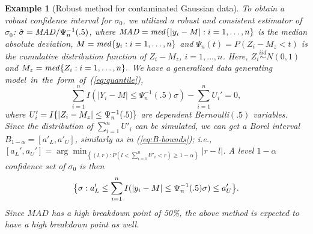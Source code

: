 \documentclass[12pt]{article}
\theoremstyle{shortspace}
\newtheorem{example}{\quad Example}
\begin{document}
\begin{example}[Robust method for contaminated Gaussian data]
To obtain a robust confidence interval for $\sigma_0$, we utilized a robust and consistent estimator of $\sigma_0$: $\hat \sigma = {\it MAD}/\Psi_n^{-1}(.5)$, 
where ${\it MAD} = {\it med}\{|y_i - M|: i = 1, \ldots, n\}$ is the median absolute deviation, $M = {\it med}\{y_i: i = 1, \ldots, n\}$ and $\Psi_n(t) = P(Z_i - M_z < t)$ is the cumulative distribution function of $Z_i - M_z$, $i = 1, \ldots, n$. Here, $Z_i \overset{iid}{\sim} N(0,1)$ and $M_z = {\it med}\{Z_i: i = 1, \ldots, n\}.$ 
We have a generalized data generating model~in~the~form~of~(\ref{eq:quantile}), 
$$\sum_{i = 1}^n I(|Y_i -M| \leq \Psi_n^{-1}(.5)\sigma ) - \sum_{i =1}^n U_i' = 0,$$ 
where $U'_i = I\{|Z_i - M_z| \leq {\small \Psi_n^{-1}(.5)}\}$ are dependent Bernoulli$(.5)$ variables. Since the distribution of $\sum\nolimits_{i = 1}^n U'_i$ can be simulated, we can get 
a Borel interval  $B_{1 -\alpha} = [a'_L, a'_U]$, similarly as in (\ref{eq:B-bounds}); i.e., 
$\left[a_L', a_U'\right] = 
     \arg \min_{\left\{(l,r): 
  P( l < \sum_{i = 1}^n U'_i < r )
     \geq 1-\alpha\right\}} |r - l|$. A level $1 - \alpha$ confidence set of $\sigma_0$ is then $$
     \big\{\sigma: a'_L \leq \sum_{i =1}^n I(|y_i - M| \leq {\small \Psi_n^{-1}(.5)} \sigma ) \leq a'_U \big\}.
     $$
     Since $MAD$ has a high breakdown point of 50\%, the above method is expected to have a high breakdown point as well.  

\end{example}
\end{document}
